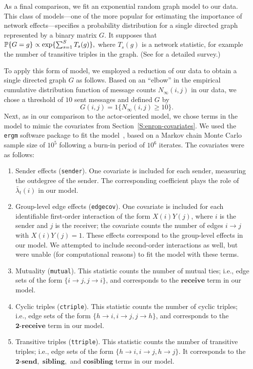 \documentclass[final]{statsoc}
\begin{document}
As a final comparison, we fit an exponential random graph model to our data.  This class of models---one of the more popular for estimating the importance of network effects---specifies a probability
distribution for a single directed graph represented by a binary matrix $G$.
It supposes that
\(
  \mathbb{P}\{ G = g \} \propto \exp\{ \sum_{s=1}^S T_s(g) \},
\)
where $T_s(g)$ is a network statistic, for example the number of transitive
triples in the graph.  (See \cite{anderson1999pstar} for a detailed survey.)

To apply this form of model, we employed a reduction of our data to obtain
a single directed graph $G$ as follows.  Based on an ``elbow'' in the empirical cumulative distribution function of message counts $N_\infty(i,j)$ in our data, we chose a threshold of $10$ sent messages and defined $G$  by
\[
  G(i,j) = 1\{ N_\infty(i,j) \geq 10 \}.
\]
Next, as in our comparison to the actor-oriented model, we chose terms in the
model to mimic the covariates from Section~\ref{S:enron-covariates}.
We used the \texttt{ergm} software package to fit the
model~\citep{ergm2011}, based on a Markov chain Monte Carlo sample size of
$10^5$ following a burn-in period of $10^6$ iterates.  The covariates were as
follows:

\begin{enumerate}
  \item Sender effects (\texttt{sender}).  One covariate is included for each sender,
  measuring the outdegree of the sender.  The corresponding coefficient plays the role of $\bar \lambda_t(i)$ in our model.

  \item Group-level edge effects (\texttt{edgecov}).  One covariate is included for each
identifiable first-order interaction of the form $X(i) Y(j)$, where $i$ is the
sender and $j$ is the receiver; the covariate counts the number of edges $i
\to j$ with $X(i) Y(j) = 1$.  These effects correspond to the group-level
effects in our model.  We attempted to include second-order
interactions as well, but were unable (for computational reasons) to fit the model with these terms.

  \item Mutuality (\texttt{mutual}).  This statistic counts the number of
mutual ties; i.e., edge sets of the form $\{ i \to j, j \to i \}$, and corresponds to the
$\textbf{receive}$ term in our model.

  \item Cyclic triples (\texttt{ctriple}).  This statistic counts the number of
cyclic triples; i.e., edge sets of the form $\{ h \to i, i \to j, j \to h \}$, and
corresponds to the $\textbf{2-receive}$ term in our model.

  \item Transitive triples (\texttt{ttriple}).  This statistic counts the
number of transitive triples; i.e., edge sets of the form $\{ h \to i, i \to j, h
\to j \}$.  It corresponds to the $\textbf{2-send},$ $\textbf{sibling},$
and $\textbf{cosibling}$ terms in our model.
\end{enumerate}
\end{document}
